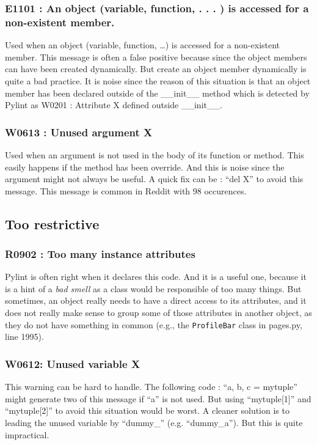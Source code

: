 \documentclass[12pt, a4paper]{article}
\newcommand{\tit}[1]{\textit{#1}}
\newcommand{\ttt}[1]{\texttt{#1}}
\newcommand{\pyl}{\textsf{Pylint}}
\begin{document}
\subsubsection*{E1101 : An object (variable, function, . . . ) is accessed for a non-existent member.}

Used when an object (variable, function, \dots{}) is accessed for a non-existent member.
This message is often a false positive because since the object members can have been created dynamically.
But create an object member dynamically is quite a bad practice.
It is noise since the reason of this situation is that an object member has been declared outside of the \_\_init\_\_ method which is detected by \pyl{} as W0201 : Attribute X defined outside \_\_init\_\_.

\subsubsection*{W0613 : Unused argument X}
Used when an argument is not used in the body of its function or method.
This easily happens if the method has been override.
And this is noise since the argument might not always be useful.
A quick fix can be : ``del X'' to avoid this message.
This message is common in Reddit with 98 occurences.

\newpage
\subsection*{Too restrictive}
\subsubsection*{R0902 : Too many instance attributes}
\pyl{} is often right when it declares this code.
And it is a useful one, because it is a hint of a \tit{bad smell} as a class would be responsible of too many things.
But sometimes, an object really needs to have a direct access to its attributes, and it does not really make sense to group some of those attributes in another object, as they do not have something in common (e.g., the \ttt{ProfileBar} class in pages.py, line 1995).

\subsubsection*{W0612: Unused variable X}

This warning can be hard to handle. 
The following code : ``a, b, c = mytuple'' might generate two of this message if ``a'' is not used.
But using ``mytuple[1]'' and ``mytuple[2]'' to avoid this situation would be worst.
A cleaner solution is to leading the unused variable by ``dummy\_'' (e.g. ``dummy\_a'').
But this is quite impractical.
\end{document}
